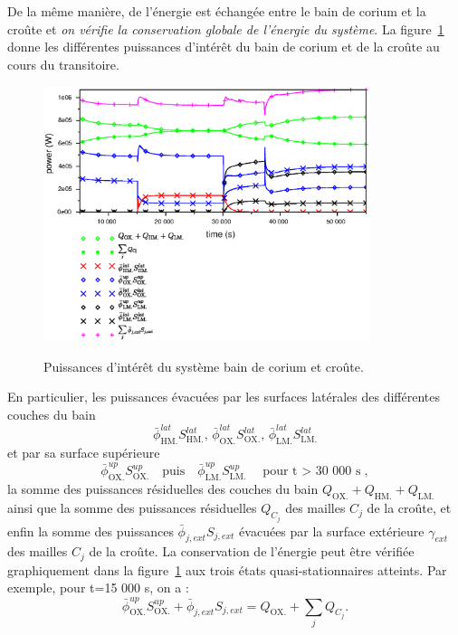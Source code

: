 De la même manière, de l'énergie est échangée entre le bain de corium et la croûte et \emph{on vérifie la conservation globale de l'énergie du système}. La figure~\ref{fig:thermal_balance} donne les différentes puissances d'intérêt du bain de corium et de la croûte au cours du transitoire.
\begin{figure}
\centering
\includegraphics[width=0.85\textwidth, keepaspectratio=true]{Figures/thermal_balance.eps}\\
\caption{Puissances d'intérêt du système bain de corium et croûte.}
\label{fig:thermal_balance}
\end{figure}
En particulier, les puissances évacuées par les surfaces latérales des différentes couches du bain 
\begin{equation*}
\bar{\phi}^{lat}_\textrm{HM.}S^{lat}_\textrm{HM.},\,\bar{\phi}^{lat}_\textrm{OX.}S^{lat}_\textrm{OX.},\,\bar{\phi}^{lat}_\textrm{LM.}S^{lat}_\textrm{LM.}
\end{equation*}
et par sa surface supérieure 
\begin{equation*}
\bar{\phi}^{up}_\textrm{OX.}S^{up}_\textrm{OX.}\quad\text{puis}\quad\bar{\phi}^{up}_\textrm{LM.}S^{up}_\textrm{LM.}\quad\text{pour t $>$ 30 000 s},
\end{equation*}
la somme des puissances résiduelles des couches du bain $Q_\textrm{OX.}+Q_\textrm{HM.}+Q_\textrm{LM.}$ ainsi que la somme des puissances résiduelles $Q_{C_j}$ des mailles $C_j$ de la croûte, et enfin la somme des puissances $\bar{\phi}_{j,ext}S_{j,ext}$ évacuées par la surface extérieure $\gamma_{ext}$ des mailles $C_j$ de la croûte. La conservation de l'énergie peut être vérifiée graphiquement dans la figure~\ref{fig:thermal_balance} aux trois états quasi-stationnaires atteints. Par exemple, pour t=15 000 s, on a :
\begin{equation}
\bar{\phi}^{up}_\textrm{OX.}S^{up}_\textrm{OX.} + \bar{\phi}_{j,ext}S_{j,ext} = Q_\textrm{OX.} + \sum_j Q_{C_j}.
\end{equation}


